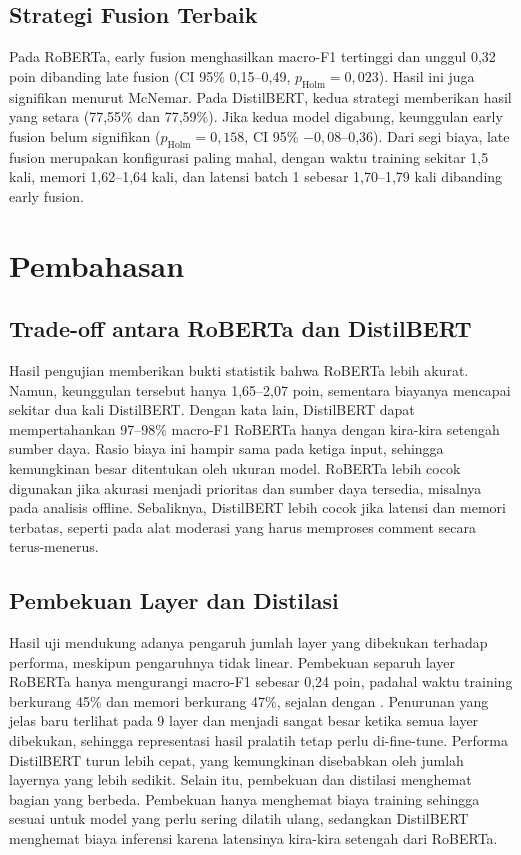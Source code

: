 \documentclass[conference]{IEEEtran}
\begin{document}
\subsection{Strategi Fusion Terbaik}
Pada RoBERTa, early fusion menghasilkan macro-F1 tertinggi dan unggul 0,32 poin dibanding late fusion (CI 95\% 0,15--0,49, $p_{\mathrm{Holm}} = 0{,}023$). Hasil ini juga signifikan menurut McNemar. Pada DistilBERT, kedua strategi memberikan hasil yang setara (77,55\% dan 77,59\%). Jika kedua model digabung, keunggulan early fusion belum signifikan ($p_{\mathrm{Holm}} = 0{,}158$, CI 95\% $-0{,}08$--0,36). Dari segi biaya, late fusion merupakan konfigurasi paling mahal, dengan waktu training sekitar 1,5 kali, memori 1,62--1,64 kali, dan latensi batch 1 sebesar 1,70--1,79 kali dibanding early fusion.

\section{Pembahasan}

\subsection{Trade-off antara RoBERTa dan DistilBERT}
Hasil pengujian memberikan bukti statistik bahwa RoBERTa lebih akurat. Namun, keunggulan tersebut hanya 1,65--2,07 poin, sementara biayanya mencapai sekitar dua kali DistilBERT. Dengan kata lain, DistilBERT dapat mempertahankan 97--98\% macro-F1 RoBERTa hanya dengan kira-kira setengah sumber daya. Rasio biaya ini hampir sama pada ketiga input, sehingga kemungkinan besar ditentukan oleh ukuran model. RoBERTa lebih cocok digunakan jika akurasi menjadi prioritas dan sumber daya tersedia, misalnya pada analisis offline. Sebaliknya, DistilBERT lebih cocok jika latensi dan memori terbatas, seperti pada alat moderasi yang harus memproses comment secara terus-menerus.

\subsection{Pembekuan Layer dan Distilasi}
Hasil uji mendukung adanya pengaruh jumlah layer yang dibekukan terhadap performa, meskipun pengaruhnya tidak linear. Pembekuan separuh layer RoBERTa hanya mengurangi macro-F1 sebesar 0,24 poin, padahal waktu training berkurang 45\% dan memori berkurang 47\%, sejalan dengan \cite{ardakani2024slimfit}. Penurunan yang jelas baru terlihat pada 9 layer dan menjadi sangat besar ketika semua layer dibekukan, sehingga representasi hasil pralatih tetap perlu di-fine-tune. Performa DistilBERT turun lebih cepat, yang kemungkinan disebabkan oleh jumlah layernya yang lebih sedikit. Selain itu, pembekuan dan distilasi menghemat bagian yang berbeda. Pembekuan hanya menghemat biaya training sehingga sesuai untuk model yang perlu sering dilatih ulang, sedangkan DistilBERT menghemat biaya inferensi karena latensinya kira-kira setengah dari RoBERTa.
\end{document}

